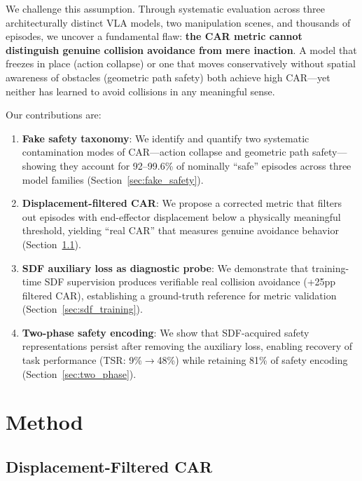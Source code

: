 \documentclass[letterpaper]{article}
\begin{document}
We challenge this assumption. Through systematic evaluation across three architecturally distinct VLA models, two manipulation scenes, and thousands of episodes, we uncover a fundamental flaw: \textbf{the CAR metric cannot distinguish genuine collision avoidance from mere inaction}. A model that freezes in place (action collapse) or one that moves conservatively without spatial awareness of obstacles (geometric path safety) both achieve high CAR---yet neither has learned to avoid collisions in any meaningful sense.

Our contributions are:
\begin{enumerate}
    \item \textbf{Fake safety taxonomy}: We identify and quantify two systematic contamination modes of CAR---action collapse and geometric path safety---showing they account for 92--99.6\% of nominally ``safe'' episodes across three model families (Section~\ref{sec:fake_safety}).
    \item \textbf{Displacement-filtered CAR}: We propose a corrected metric that filters out episodes with end-effector displacement below a physically meaningful threshold, yielding ``real CAR'' that measures genuine avoidance behavior (Section~\ref{sec:metric}).
    \item \textbf{SDF auxiliary loss as diagnostic probe}: We demonstrate that training-time SDF supervision produces verifiable real collision avoidance (+25pp filtered CAR), establishing a ground-truth reference for metric validation (Section~\ref{sec:sdf_training}).
    \item \textbf{Two-phase safety encoding}: We show that SDF-acquired safety representations persist after removing the auxiliary loss, enabling recovery of task performance (TSR: 9\%$\to$48\%) while retaining 81\% of safety encoding (Section~\ref{sec:two_phase}).
\end{enumerate}

\section{Method}
\label{sec:method}

\subsection{Displacement-Filtered CAR}
\label{sec:metric}
\end{document}
